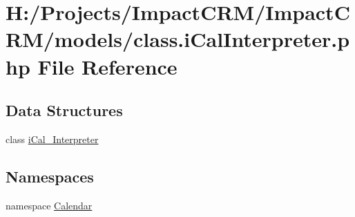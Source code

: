 \hypertarget{class_8iCalInterpreter_8php}{
\section{H:/Projects/ImpactCRM/ImpactCRM/models/class.iCalInterpreter.php File Reference}
\label{class_8iCalInterpreter_8php}
}
\subsection*{Data Structures}
\begin{DoxyCompactItemize}
\item 
class \hyperlink{classiCal__Interpreter}{iCal\_\-Interpreter}
\end{DoxyCompactItemize}
\subsection*{Namespaces}
\begin{DoxyCompactItemize}
\item 
namespace \hyperlink{namespaceCalendar}{Calendar}
\end{DoxyCompactItemize}
